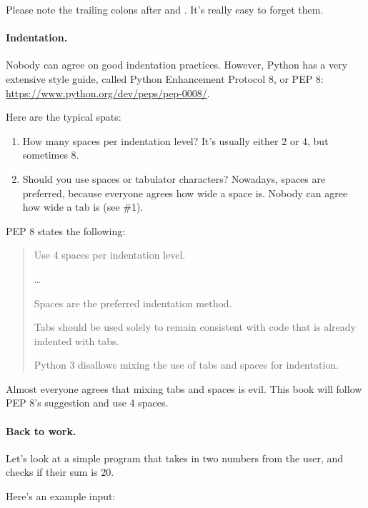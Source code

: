 \begin{remark}
  Please note the trailing colons after  and
  . It's really easy to forget them.
\end{remark}

\paragraph{Indentation.}

Nobody can agree on good indentation practices. However, Python has a
very extensive style guide, called Python Enhancement Protocol 8, or
PEP 8: \url{https://www.python.org/dev/peps/pep-0008/}.

Here are the typical spats:

\begin{enumerate}
\item How many spaces per indentation level? It's usually either 2 or
  4, but sometimes 8.
\item Should you use spaces or tabulator characters? Nowadays, spaces
  are preferred, because everyone agrees how wide a space is. Nobody
  can agree how wide a tab is (see \#1).
\end{enumerate}

PEP 8 states the following:

\begin{quotation}
  Use 4 spaces per indentation level. 

  \dots

  Spaces are the preferred indentation method.

  Tabs should be used solely to remain consistent with code that is already indented with tabs.

  Python 3 disallows mixing the use of tabs and spaces for indentation.
\end{quotation}

Almost everyone agrees that mixing tabs and spaces is evil. This book
will follow PEP 8's suggestion and use 4 spaces.

\paragraph{Back to work.}

Let's look at a simple program that takes in two numbers from the
user, and checks if their sum is $20$.


Here's an example input:

